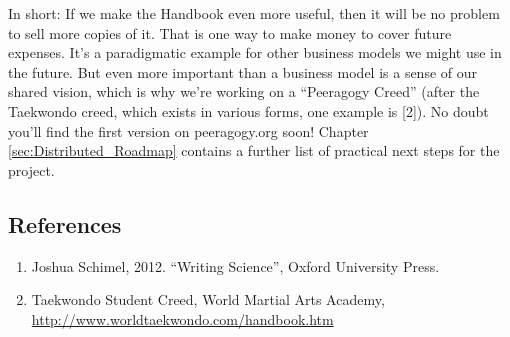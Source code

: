 In short: If we make the Handbook even more useful, then it will be no
problem to sell more copies of it. That is one way to make money to
cover future expenses. It's a paradigmatic example for other business
models we might use in the future. But even more important than
a business model is a sense of our shared vision, which is why
we're working on a ``Peeragogy Creed'' (after the Taekwondo creed, which
exists in various forms, one example is {[}2{]}).  No doubt you'll
find the first version on peeragogy.org soon!  Chapter
\ref{sec:Distributed_Roadmap} contains a further list of practical
next steps for the project.

\subsection*{References}\label{references}

\begin{enumerate}
\def\labelenumi{\arabic{enumi}.}
\item
  Joshua Schimel, 2012. ``Writing Science'', Oxford University Press.
\item
  Taekwondo Student Creed, World Martial Arts Academy, \url{http://www.worldtaekwondo.com/handbook.htm}
\end{enumerate}
